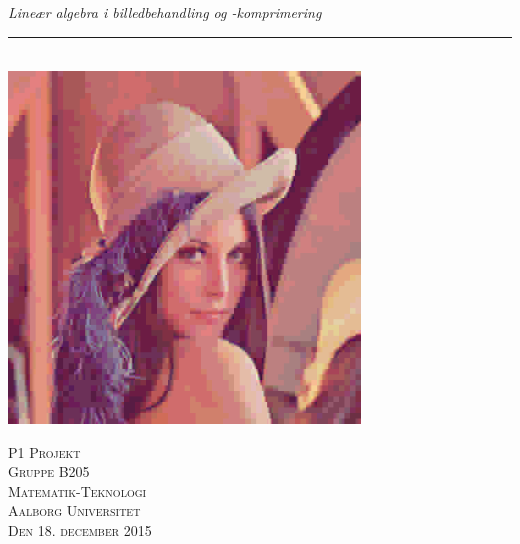 \thispagestyle{empty}
\begin{flushright}
\vspace{3cm}

\phantom{hul}

\phantom{hul}

\phantom{hul}

\textsl{\Huge Lineær algebra i billedbehandling og -komprimering} \\


\rule{13cm}{3mm} \\ \vspace{1.5cm}
\vspace{1cm}
\centering
\includegraphics[width=0.7\textwidth]{Billeder/lenaQ5}

\vspace{2cm} 
\textsc{\Large P1 Projekt \\
Gruppe B205 \\
Matematik-Teknologi\\
Aalborg Universitet\\
Den 18. december 2015\\}
\end{flushright}
